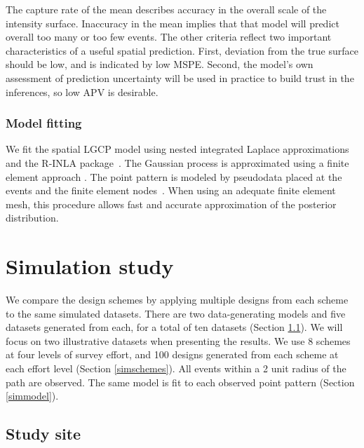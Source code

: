 \documentclass[review]{elsarticle}
\begin{document}
The capture rate of the mean describes accuracy in the overall scale of the
intensity surface. Inaccuracy in the mean implies that that model will predict
overall too many or too few events. The other criteria reflect two important
characteristics of a useful spatial prediction. First, deviation from the true
surface should be low, and is indicated by low MSPE. Second, the model's own
assessment of prediction uncertainty will be used in practice to build trust in
the inferences, so low APV is desirable. 


\subsubsection{Model fitting}

We fit the spatial LGCP model using nested integrated Laplace approximations
and the R-INLA package~\citep{rueetal,rinla}. The Gaussian process is
approximated using a finite element approach \citep{lindgrenetal}. The point
pattern is modeled by pseudodata placed at the events and the finite element
nodes~\citep{simpsonetal}. When using an adequate finite element mesh, this
procedure allows fast and accurate approximation of the posterior
distribution.%


\section{Simulation study}

We compare the design schemes by applying multiple designs from each scheme
to the same simulated datasets. There are two data-generating models and five
datasets generated from each, for a total of ten datasets
(Section \ref{simsite}). We will focus on two illustrative datasets when
presenting the results. We use 8 schemes at four levels of survey effort, and
100 designs generated from each scheme at each effort level
(Section \ref{simschemes}). All events within a 2 unit radius of the path are
observed. The same model is fit to each observed point pattern
(Section \ref{simmodel}).



\subsection{Study site}
\label{simsite}
\end{document}
